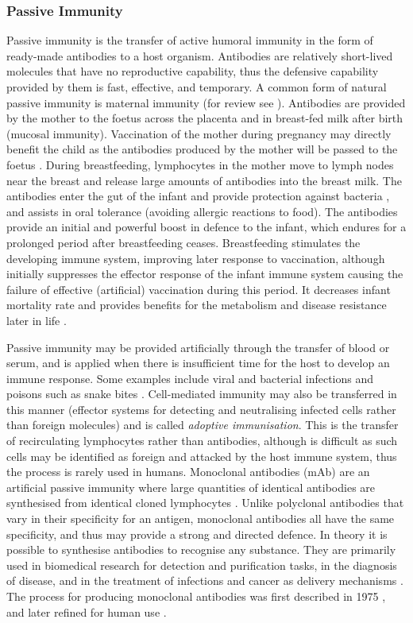 \subsubsection{Passive Immunity}
Passive immunity is the transfer of active humoral immunity in the form of ready-made antibodies to a host organism. Antibodies are relatively short-lived molecules that have no reproductive capability, thus the defensive capability provided by them is fast, effective, and temporary. A common form of natural passive immunity is maternal immunity (for review see \cite{Bienenstock1980, Englund1998, Hanson2003, Brandtzaeg2003}). Antibodies are provided by the mother to the foetus across the placenta and in breast-fed milk after birth (mucosal immunity). Vaccination of the mother during pregnancy may directly benefit the child as the antibodies produced by the mother will be passed to the foetus \cite{Glezen1999}. During breastfeeding, lymphocytes in the mother move to lymph nodes near the breast and release large amounts of antibodies into the breast milk. The antibodies enter the gut of the infant and provide protection against bacteria \cite{Slade1987}, and assists in oral tolerance (avoiding allergic reactions to food). The antibodies provide an initial and powerful boost in defence to the infant, which endures for a prolonged period after breastfeeding ceases. Breastfeeding stimulates the developing immune system, improving later response to vaccination, although initially suppresses the effector response of the infant immune system causing the failure of effective (artificial) vaccination during this period. It decreases infant mortality rate and provides benefits for the metabolism and disease resistance later in life \cite{Oddy2001}.

Passive immunity may be provided artificially through the transfer of blood or serum, and is applied when there is insufficient time for the host to develop an immune response. Some examples include viral and bacterial infections and poisons such as snake bites \cite{Keller2000}. Cell-mediated immunity may also be transferred in this manner (effector systems for detecting and neutralising infected cells rather than foreign molecules) and is called \emph{adoptive immunisation}. This is the transfer of recirculating lymphocytes rather than antibodies, although is difficult as such cells may be identified as foreign and attacked by the host immune system, thus the process is rarely used in humans. Monoclonal antibodies (mAb) are an artificial passive immunity where large quantities of identical antibodies are synthesised from identical cloned lymphocytes \cite{Vaughan1998}. Unlike polyclonal antibodies that vary in their specificity for an antigen, monoclonal antibodies all have the same specificity, and thus may provide a strong and directed defence. In theory it is possible to synthesise antibodies to recognise any substance. They are primarily used in biomedical research for detection and purification tasks, in the diagnosis of disease, and in the treatment of infections and cancer as delivery mechanisms \cite{Waldmann2003}. The process for producing monoclonal antibodies was first described in 1975 \cite{Kohler1975}, and later refined for human use \cite{Riechmann1988}.

